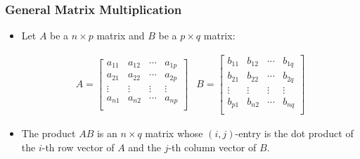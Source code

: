 \documentclass{beamer}
\begin{document}
\begin{frame}
  \frametitle{General Matrix Multiplication}

\begin{itemize}
	\item Let $A$ be a $n \times p$ matrix and $B$ be a $p \times q$ matrix:

\[
\begin{array}{cc}
A = \left[ \begin{array}{cccc}

a_{11} & a_{12} & \cdots & a_{1p} \\
a_{21} & a_{22} & \cdots & a_{2p} \\
\vdots & \vdots & \vdots & \vdots \\
a_{n1} & a_{n2} & \cdots & a_{np} \\

\end{array}
\right]

&	

B = \left[ \begin{array}{cccc}

b_{11} & b_{12} & \cdots & b_{1q} \\
b_{21} & b_{22} & \cdots & b_{2q} \\
\vdots & \vdots & \vdots & \vdots \\
b_{p1} & b_{n2} & \cdots & b_{nq} \\

\end{array}
\right]
\end{array}
\]	

	
\item The product $AB$ is an $n \times q$ matrix whose $(i,j)$-entry is the dot product of the $i$-th row vector of $A$ and the $j$-th column vector of $B$.

\end{itemize}

\end{frame}

\end{document}
